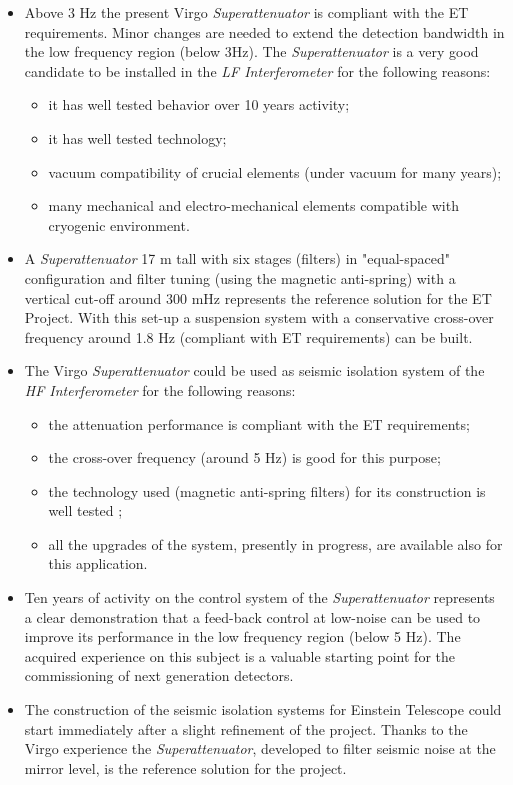 { 
\begin{itemize}
\item Above 3 Hz the present Virgo \emph{Superattenuator} is compliant with the ET requirements. Minor changes are needed to extend the detection bandwidth in the low frequency region (below 3Hz). The \emph{Superattenuator} is a very good candidate to be installed in the \emph {LF Interferometer} for the following reasons:
	\begin{itemize}
	\item it has well tested behavior over 10 years activity;
	\item it has well tested technology;
	\item vacuum compatibility of crucial elements (under vacuum for many years);
	\item many mechanical and electro-mechanical elements compatible with cryogenic environment.
	\end{itemize}
\item A \emph{Superattenuator} 17 m tall with six stages (filters) in "equal-spaced" configuration and filter tuning (using the magnetic anti-spring) with a vertical cut-off around 300 mHz represents the reference solution for the ET Project. With this set-up a suspension system with a conservative cross-over frequency around 1.8 Hz (compliant with ET requirements) can be built.
\item The Virgo \emph{Superattenuator} could be used as seismic isolation system of the \emph {HF Interferometer} for the following reasons:
	\begin{itemize}
		\item the attenuation performance is compliant with the ET requirements;
		\item the cross-over frequency (around 5 Hz) is good for this purpose;
		\item the technology used (magnetic anti-spring filters) for its construction is well tested ;
		\item all the upgrades of the system, presently in progress, are available also for this application.
	\end{itemize}
\item Ten years of activity on the control system of the \emph{Superattenuator} represents a clear demonstration that a feed-back control at low-noise can be used to improve its performance in the low frequency region (below 5 Hz). The acquired experience on this subject is a valuable starting point for the commissioning of next generation detectors.
\item The construction of the seismic isolation systems for Einstein Telescope could start immediately after a slight refinement of the project. Thanks to the Virgo experience the \emph{Superattenuator}, developed to filter seismic noise at the mirror level, is the reference solution for the project.
\end{itemize}
}
